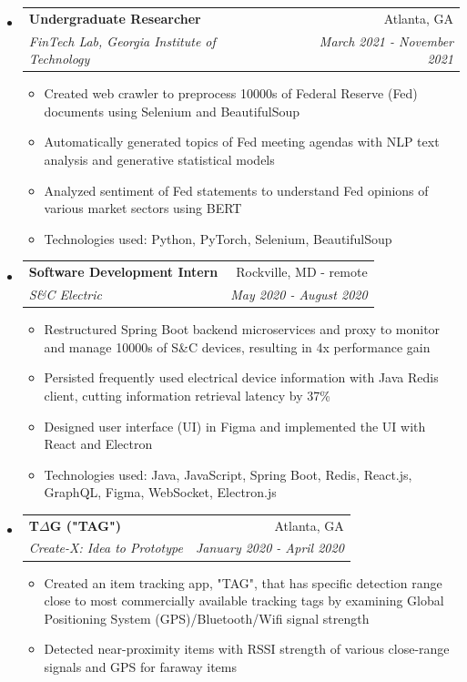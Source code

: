 \documentclass[letterpaper,10pt]{article}
\makeatletter
\newcommand{\resitem}[1]{\item #1 \vspace{-3.5pt}}  %
\newcommand{\ressubheading}[4]{
\begin{tabular*}{7.0in}{l@{\extracolsep{\fill}}r}  
		\textbf{#1} & #2 \\
		\textit{#3} & \textit{#4} \\
\end{tabular*}\vspace{-6pt}}  %
\makeatother
\begin{document}
\begin{itemize}
\item
    \ressubheading{Undergraduate Researcher}{Atlanta, GA}{FinTech Lab, Georgia Institute of Technology}{March 2021 - November 2021}
    \begin{itemize}
        \resitem{Created web crawler to preprocess 10000s of Federal Reserve (Fed) documents using Selenium and BeautifulSoup}
        \resitem{Automatically generated topics of Fed meeting agendas with NLP text analysis and generative statistical models}
        \resitem{Analyzed sentiment of Fed statements to understand Fed opinions of various market sectors using BERT}
        \resitem{Technologies used: Python, PyTorch, Selenium, BeautifulSoup}
    \end{itemize}
\item
    \ressubheading{Software Development Intern}{Rockville, MD - remote}{S\&C Electric}{May 2020 - August 2020}
    \begin{itemize}
        \resitem{Restructured Spring Boot backend microservices and proxy to monitor and manage 10000s of S\&C devices, resulting in 4x performance gain}
        \resitem{Persisted frequently used electrical device information with Java Redis client, cutting information retrieval latency by 37\%}
        \resitem{Designed user interface (UI) in Figma and implemented the UI with React and Electron}
        \resitem{Technologies used: Java, JavaScript, Spring Boot, Redis, React.js, GraphQL, Figma, WebSocket, Electron.js}
    \end{itemize}
\item
    \ressubheading{T$\Delta$G ("TAG")}{Atlanta, GA}{Create-X: Idea to Prototype}{January 2020 - April 2020}
    \begin{itemize}
        \resitem{Created an item tracking app, "TAG", that has specific detection range close to most commercially available tracking tags by examining Global Positioning System (GPS)/Bluetooth/Wifi signal strength}
        \resitem{Detected near-proximity items with RSSI strength of various close-range signals and GPS for faraway items}

\end{itemize}
\end{itemize}
\end{document}

